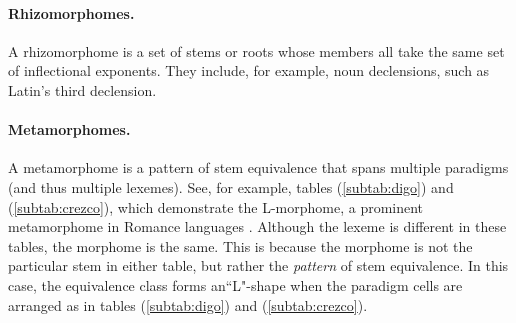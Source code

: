 \paragraph{Rhizomorphomes.} A rhizomorphome is a set of stems or roots
 whose members all take the same set of inflectional exponents. They include, for example,
 noun declensions, such as Latin's third declension.
\paragraph{Metamorphomes.} A metamorphome is a pattern of stem equivalence that spans multiple paradigms 
(and thus multiple lexemes). See, for example, tables (\ref{subtab:digo}) and (\ref{subtab:crezco}), which demonstrate the L-morphome, a prominent metamorphome in Romance languages \citep{maiden:2005}. Although the lexeme is different in these tables, the morphome is the same. This is because the morphome is not the particular stem in either table, but rather the \emph{pattern} of stem equivalence. In this case, the equivalence class forms  an``L"-shape when the paradigm cells are arranged as in tables (\ref{subtab:digo}) and (\ref{subtab:crezco}).
% 



